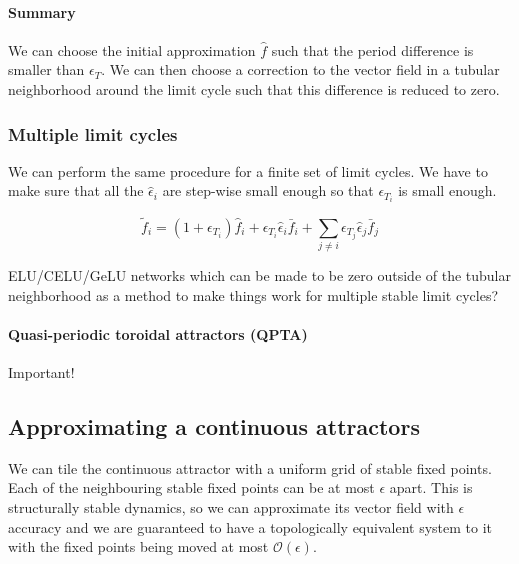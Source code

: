 \documentclass{article}
\theoremstyle{definition}
\theoremstyle{remark}
\newcounter{ct}
\begin{document}
\paragraph{Summary}
We can choose the initial approximation $\hat{f}$ such that the period difference is smaller than $\epsilon_T$.
We can then choose a correction to the vector field in a tubular neighborhood around the limit cycle such that this difference is reduced to zero.


\subsubsection{Multiple limit cycles}
We can perform the same procedure for a finite set of limit cycles.
We have to make sure that all the $\hat{\epsilon}_i$ are step-wise small enough so that $\epsilon_{T_i}$ is small enough. 

\[ \tilde f_i = (1+ \epsilon_{T_i})\hat{f}_i + \epsilon_{T_i}\hat{\epsilon}_i\bar{f}_i + \sum_{j\neq i}\epsilon_{T_j}\hat{\epsilon}_j\bar{f}_j\]


 ELU/CELU/GeLU networks\citep{clevert2015elu,barron2017celu,elfwing2018sigmoid} which can be made to be zero outside of the tubular neighborhood as a method to make things work for multiple stable limit cycles?



\paragraph{Quasi-periodic toroidal attractors (QPTA)}%
Important!\citep{Park2023a}



\subsection{Approximating a continuous attractors}\label{sec:chaos}

We can tile the continuous attractor with a uniform grid of stable fixed points.
Each of the neighbouring stable fixed points can be at most $\epsilon$ apart.
This is structurally stable dynamics, so we can approximate its vector field with $\epsilon$ accuracy and we are guaranteed to have a topologically equivalent system to it with the fixed points being moved at most $\mathcal{O}(\epsilon)$.
\end{document}
